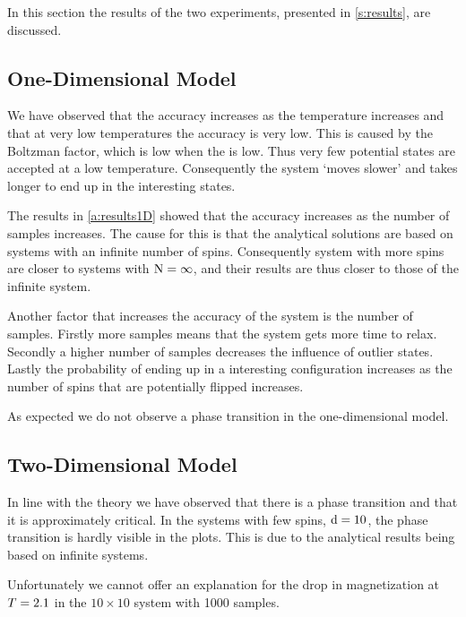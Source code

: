 In this section the results of the two experiments, presented in \cref{s:results}, are discussed.

\subsection{One-Dimensional Model}
	
	We have observed that the accuracy increases as the temperature increases and that at very low temperatures the accuracy is very low. This is caused by the Boltzman factor, which is low when the \temperature is low. Thus very few potential states are accepted at a low temperature. Consequently the system `moves slower' and takes longer to end up in the interesting states.
	
	The results in \cref{a:results1D} showed that the accuracy increases as the number of samples increases. The cause for this is that the analytical solutions are based on systems with an infinite number of spins. Consequently system with more spins are closer to systems with $\mathrm{N} = \infty$, and their results are thus closer to those of the infinite system. 

	Another factor that increases the accuracy of the system is the number of samples. Firstly more samples means that the system gets more time to relax. Secondly a higher number of samples decreases the influence of outlier states. Lastly the probability of ending up in a interesting configuration increases as the number of spins that are potentially flipped increases.

	As expected we do not observe a phase transition in the one-dimensional model. 

\subsection{Two-Dimensional Model}
	In line with the theory we have observed that there is a phase transition and that it is approximately critical. In the systems with few spins, $\mathrm{d} = 10$, the phase transition is hardly visible in the plots. This is due to the analytical results being based on infinite systems. 

	Unfortunately we cannot offer an explanation for the drop in magnetization at $T = 2.1$ in the $10 \times 10$ system with 1000 samples.